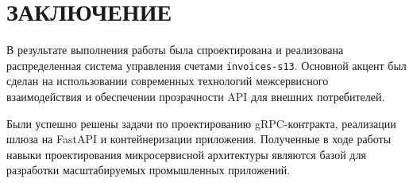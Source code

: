 \section*{ЗАКЛЮЧЕНИЕ}

В результате выполнения работы была спроектирована и реализована распределенная система управления счетами \texttt{invoices-s13}. Основной акцент был сделан на использовании современных технологий межсервисного взаимодействия и обеспечении прозрачности API для внешних потребителей.

Были успешно решены задачи по проектированию gRPC-контракта, реализации шлюза на FastAPI и контейнеризации приложения. Полученные в ходе работы навыки проектирования микросервисной архитектуры являются базой для разработки масштабируемых промышленных приложений.
